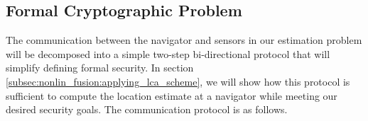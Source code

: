 % 
% 

\subsection{Formal Cryptographic Problem}\label{subsec:nonlin_fusion:crypto_problem}
The communication between the navigator and sensors in our estimation problem will be decomposed into a simple two-step bi-directional protocol that will simplify defining formal security. In section \ref{subsec:nonlin_fusion:applying_lca_scheme}, we will show how this protocol is sufficient to compute the location estimate at a navigator while meeting our desired security goals. The communication protocol is as follows.

